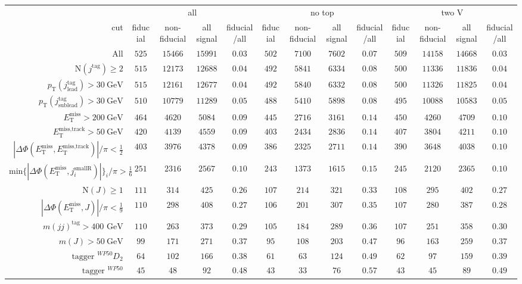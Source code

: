 \begin{tabular}{r|c|c|c|c|c|c|c|c|c|c|c|c|}
 &\multicolumn{4}{|c|}{all}&\multicolumn{4}{c|}{no top}&\multicolumn{4}{|c|}{two V}\\
cut&fiducial&non-fiducial&all signal&fiducial/all&fiducial&non-fiducial&all signal&fiducial/all&fiducial&non-fiducial&all signal&fiducial/all\\
\hline
All&$525$&$15466$&$15991$&$0.03$&$502$&$7100$&$7602$&$0.07$&$509$&$14158$&$14668$&$0.03$\\
$\text{N}(j^\text{tag})\geq2$&$515$&$12173$&$12688$&$0.04$&$492$&$5841$&$6334$&$0.08$&$500$&$11336$&$11836$&$0.04$\\
$p_\text{T}(j^\text{tag}_\text{lead})>30~\text{GeV}$&$515$&$12161$&$12677$&$0.04$&$492$&$5840$&$6332$&$0.08$&$500$&$11326$&$11825$&$0.04$\\
$p_\text{T}(j^\text{tag}_\text{sublead})>30~\text{GeV}$&$510$&$10779$&$11289$&$0.05$&$488$&$5410$&$5898$&$0.08$&$495$&$10088$&$10583$&$0.05$\\
$E_\text{T}^\text{miss} > 200~\text{GeV}$&$464$&$4620$&$5084$&$0.09$&$445$&$2716$&$3161$&$0.14$&$450$&$4260$&$4709$&$0.10$\\
$E_\text{T}^\text{miss,track} > 50~\text{GeV}$&$420$&$4139$&$4559$&$0.09$&$403$&$2434$&$2836$&$0.14$&$407$&$3804$&$4211$&$0.10$\\
$|\Delta\Phi(E_\text{T}^\text{miss},E_\text{T}^\text{miss,track})|/\pi<\frac{1}{2}$&$403$&$3976$&$4378$&$0.09$&$386$&$2325$&$2711$&$0.14$&$390$&$3648$&$4038$&$0.10$\\
$\text{min}\{|\Delta\Phi(E_\text{T}^\text{miss},j^\text{smallR}_i)|\}_i/\pi > \frac{1}{6}$&$251$&$2316$&$2567$&$0.10$&$243$&$1373$&$1615$&$0.15$&$245$&$2120$&$2365$&$0.10$\\
$\text{N}(J)\geq1$&$111$&$314$&$425$&$0.26$&$107$&$214$&$321$&$0.33$&$108$&$295$&$402$&$0.27$\\
$|\Delta\Phi(E_\text{T}^\text{miss},J)|/\pi < \frac{1}{9}$&$110$&$298$&$408$&$0.27$&$106$&$201$&$307$&$0.35$&$107$&$280$&$387$&$0.28$\\
$m(jj)^\text{tag}>400\text{ GeV}$&$110$&$263$&$373$&$0.29$&$105$&$184$&$289$&$0.36$&$107$&$251$&$358$&$0.30$\\
$m(J)>50~\text{GeV}$&$99$&$171$&$271$&$0.37$&$95$&$108$&$203$&$0.47$&$96$&$163$&$259$&$0.37$\\
$\text{tagger }^{WP50} D_{2}$&$64$&$102$&$166$&$0.38$&$61$&$63$&$124$&$0.49$&$62$&$97$&$159$&$0.39$\\
$\text{tagger }^{WP50}$&$45$&$48$&$92$&$0.48$&$43$&$33$&$76$&$0.57$&$43$&$45$&$89$&$0.49$\\
\end{tabular}
